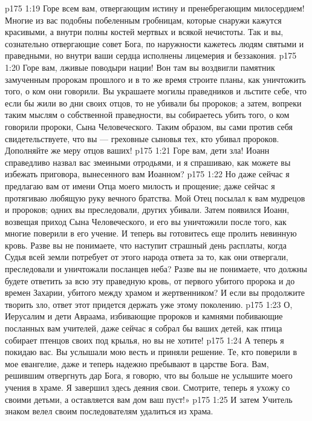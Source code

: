 \vs p175 1:19 Горе всем вам, отвергающим истину и пренебрегающим милосердием! Многие из вас подобны побеленным гробницам, которые снаружи кажутся красивыми, а внутри полны костей мертвых и всякой нечистоты. Так и вы, сознательно отвергающие совет Бога, по наружности кажетесь людям святыми и праведными, но внутри ваши сердца исполнены лицемерия и беззакония.
\vs p175 1:20 Горе вам, лживые поводыри нации! Вон там вы воздвигли памятник замученным пророкам прошлого и в то же время строите планы, как уничтожить того, о ком они говорили. Вы украшаете могилы праведников и льстите себе, что если бы жили во дни своих отцов, то не убивали бы пророков; а затем, вопреки таким мыслям о собственной праведности, вы собираетесь убить того, о ком говорили пророки, Сына Человеческого. Таким образом, вы сами против себя свидетельствуете, что вы --- греховные сыновья тех, кто убивал пророков. Дополняйте же меру отцов ваших!
\vs p175 1:21 Горе вам, дети зла! Иоанн справедливо назвал вас змеиными отродьями, и я спрашиваю, как можете вы избежать приговора, вынесенного вам Иоанном?
\vs p175 1:22 Но даже сейчас я предлагаю вам от имени Отца моего милость и прощение; даже сейчас я протягиваю любящую руку вечного братства. Мой Отец посылал к вам мудрецов и пророков; одних вы преследовали, других убивали. Затем появился Иоанн, возвещая приход Сына Человеческого, и его вы уничтожили после того, как многие поверили в его учение. И теперь вы готовитесь еще пролить невинную кровь. Разве вы не понимаете, что наступит страшный день расплаты, когда Судья всей земли потребует от этого народа ответа за то, как они отвергали, преследовали и уничтожали посланцев неба? Разве вы не понимаете, что должны будете ответить за всю эту праведную кровь, от первого убитого пророка и до времен Захарии, убитого между храмом и жертвенником? И если вы продолжите творить зло, ответ этот придется держать уже этому поколению.
\vs p175 1:23 О, Иерусалим и дети Авраама, избивающие пророков и камнями побивающие посланных вам учителей, даже сейчас я собрал бы ваших детей, как птица собирает птенцов своих под крылья, но вы не хотите!
\vs p175 1:24 А теперь я покидаю вас. Вы услышали мою весть и приняли решение. Те, кто поверили в мое евангелие, даже и теперь надежно пребывают в царстве Бога. Вам, решившим отвергнуть дар Бога, я говорю, что вы больше не услышите моего учения в храме. Я завершил здесь деяния свои. Смотрите, теперь я ухожу со своими детьми, а оставляется вам дом ваш пуст!»
\vs p175 1:25 И затем Учитель знаком велел своим последователям удалиться из храма.
